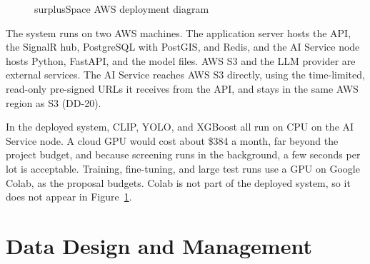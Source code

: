 \begin{figure}[H]
\caption{surplusSpace AWS deployment diagram}
\label{fig:deployment-diagram}
\end{figure}

The system runs on two AWS machines. The application server hosts the API, the
SignalR hub, PostgreSQL with PostGIS, and Redis, and the AI Service node hosts
Python, FastAPI, and the model files. AWS S3 and the LLM provider are external
services. The AI Service reaches AWS S3 directly, using the time-limited, read-only
pre-signed URLs it receives from the API, and stays in the same AWS region as S3
(DD-20).

In the deployed system, CLIP, YOLO, and XGBoost all run on CPU on the AI Service
node. A cloud GPU would cost about \$384 a month, far beyond the project budget, and
because screening runs in the background, a few seconds per lot is acceptable.
Training, fine-tuning, and large test runs use a GPU on Google Colab, as the proposal
budgets. Colab is not part of the deployed system, so it does not appear in
Figure~\ref{fig:deployment-diagram}.

\section{Data Design and Management}
\label{sec:data-design}


